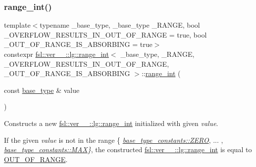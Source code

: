 \subsubsection{\texorpdfstring{range\_int()}{range\_int()}}
{\footnotesize\ttfamily template$<$typename \+\_\+base\+\_\+type, \+\_\+base\+\_\+type \+\_\+\+R\+A\+N\+GE, bool \+\_\+\+O\+V\+E\+R\+F\+L\+O\+W\+\_\+\+R\+E\+S\+U\+L\+T\+S\+\_\+\+I\+N\+\_\+\+O\+U\+T\+\_\+\+O\+F\+\_\+\+R\+A\+N\+GE = true, bool \+\_\+\+O\+U\+T\+\_\+\+O\+F\+\_\+\+R\+A\+N\+G\+E\+\_\+\+I\+S\+\_\+\+A\+B\+S\+O\+R\+B\+I\+NG = true$>$ \\
constexpr \mbox{\hyperlink{classfsl_1_1ver__1__0_1_1lg_1_1range__int}{fsl\+::ver\+\_\+\_\+::lg\+::range\+\_\+int}}$<$ \+\_\+base\+\_\+type, \+\_\+\+R\+A\+N\+GE, \+\_\+\+O\+V\+E\+R\+F\+L\+O\+W\+\_\+\+R\+E\+S\+U\+L\+T\+S\+\_\+\+I\+N\+\_\+\+O\+U\+T\+\_\+\+O\+F\+\_\+\+R\+A\+N\+GE, \+\_\+\+O\+U\+T\+\_\+\+O\+F\+\_\+\+R\+A\+N\+G\+E\+\_\+\+I\+S\+\_\+\+A\+B\+S\+O\+R\+B\+I\+NG $>$\+::\mbox{\hyperlink{classfsl_1_1ver__1__0_1_1lg_1_1range__int}{range\+\_\+int}} (\begin{DoxyParamCaption}\item[{const \mbox{\hyperlink{classfsl_1_1ver__1__0_1_1lg_1_1range__int_aa6c763f6d72d18c8b9129c0c06628cd3}{base\+\_\+type}} \&}]{value }\end{DoxyParamCaption})\hspace{0.3cm}{\ttfamily [inline]}}



Constructs a new \mbox{\hyperlink{classfsl_1_1ver__1__0_1_1lg_1_1range__int}{fsl\+::ver\+\_\+\_\+::lg\+::range\+\_\+int}} initialized with given {\itshape value}. 

If the given {\itshape value} is not in the range \{ {\itshape \mbox{\hyperlink{structfsl_1_1ver__1__0_1_1lg_1_1range__int_1_1base__type__constants_ada13cd01546095bb61095888cd0ab41d}{base\+\_\+type\+\_\+constants\+::\+Z\+E\+RO}}}, ... , {\itshape \mbox{\hyperlink{structfsl_1_1ver__1__0_1_1lg_1_1range__int_1_1base__type__constants_ae6291d70cbe40dbc429eba9cc4db9d27}{base\+\_\+type\+\_\+constants\+::\+M\+AX}}\}}, the constructed \mbox{\hyperlink{classfsl_1_1ver__1__0_1_1lg_1_1range__int}{fsl\+::ver\+\_\+\_\+::lg\+::range\+\_\+int}} is equal to \mbox{\hyperlink{classfsl_1_1ver__1__0_1_1lg_1_1range__int_a4262605b56b8b319c33b0d1ccb190a82}{O\+U\+T\+\_\+\+O\+F\+\_\+\+R\+A\+N\+GE}}. 

